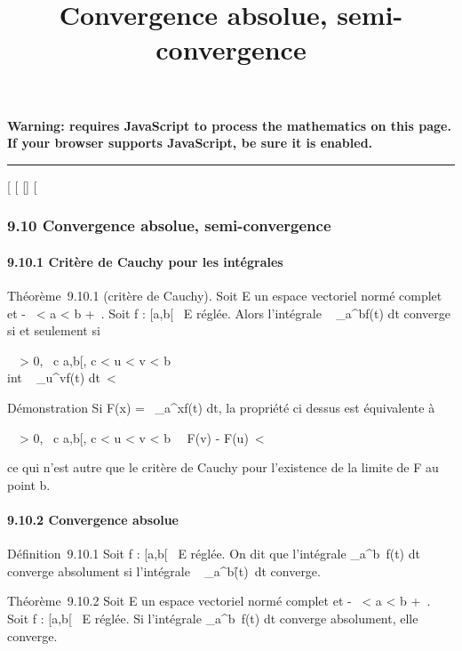 \documentclass[]{article}
\title{Convergence absolue, semi-convergence}
\author{}
\date{}
\begin{document}
\maketitle

\textbf{Warning: 
requires JavaScript to process the mathematics on this page.\\ If your
browser supports JavaScript, be sure it is enabled.}

\begin{center}\rule{3in}{0.4pt}\end{center}

{[}
{[}
{[}{]}
{[}

\subsubsection{9.10 Convergence absolue, semi-convergence}

\paragraph{9.10.1 Critère de Cauchy pour les intégrales}

Théorème~9.10.1 (critère de Cauchy). Soit E un espace vectoriel normé
complet et -\infty~ \textless{} a \textless{} b \leq +\infty~. Soit f : {[}a,b{[}\rightarrow~ E
réglée. Alors l'intégrale \int ~
_a^bf(t) dt converge si et seulement si~

\forall~~\epsilon \textgreater{} 0,
\exists~c \in {[}a,b{[}, c \textless{} u \textless{} v
\textless{} b \rigtharrow~\\int ~
_u^vf(t) dt\ \textless{} \epsilon

Démonstration Si F(x) =\int ~
_a^xf(t) dt, la propriété ci dessus est équivalente à

\forall~~\epsilon \textgreater{} 0,
\exists~c \in {[}a,b{[}, c \textless{} u \textless{} v
\textless{} b \rigtharrow~\ F(v) -
F(u)\ \textless{} \epsilon

ce qui n'est autre que le critère de Cauchy pour l'existence de la
limite de F au point b.

\paragraph{9.10.2 Convergence absolue}

Définition~9.10.1 Soit f : {[}a,b{[}\rightarrow~ E réglée. On dit que l'intégrale
\int  _a^b~f(t) dt converge
absolument si l'intégrale \int ~
_a^b\f(t)\
dt converge.

Théorème~9.10.2 Soit E un espace vectoriel normé complet et -\infty~
\textless{} a \textless{} b \leq +\infty~. Soit f : {[}a,b{[}\rightarrow~ E réglée. Si
l'intégrale \int  _a^b~f(t) dt
converge absolument, elle converge.
\end{document}
